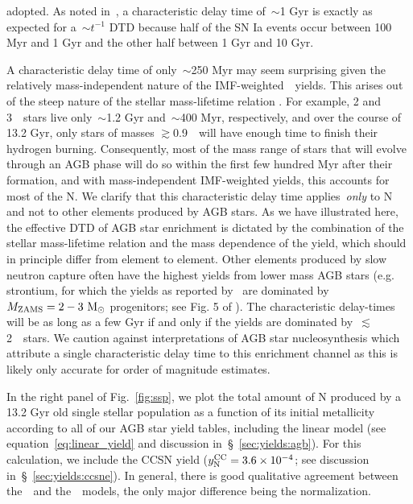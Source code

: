 \documentclass[ms.tex]{subfiles}
\begin{document}
adopted.
As noted in~\citet{Johnson2021}, a characteristic delay time of~$\sim$1 Gyr
is exactly as expected for a~$\sim t^{-1}$ DTD because half of the SN Ia
events occur between 100 Myr and 1 Gyr and the other half between 1 Gyr and
10 Gyr.
\par
A characteristic delay time of only~$\sim$250 Myr may seem surprising given
the relatively mass-independent nature of the IMF-weighted~\cristallo~yields.
This arises out of the steep nature of the stellar mass-lifetime relation
\citep[e.g.][]{Larson1974, Maeder1998, Padovani1993}.
For example, 2 and 3~\msun~stars live only~$\sim$1.2 Gyr and~$\sim$400 Myr,
respectively, and over the course of 13.2 Gyr, only stars of masses
$\gtrsim$0.9~\msun~will have enough time to finish their hydrogen burning.
Consequently, most of the mass range of stars that will evolve through an
AGB phase will do so within the first few hundred Myr after their formation,
and with mass-independent IMF-weighted yields, this accounts for most of the
N.
We clarify that this characteristic delay time applies~\textit{only} to N and
not to other elements produced by AGB stars.
As we have illustrated here, the effective DTD of AGB star enrichment is
dictated by the combination of the stellar mass-lifetime relation and the
mass dependence of the yield, which should in principle differ from element to
element.
Other elements produced by slow neutron capture often have the highest yields
from lower mass AGB stars (e.g. strontium, for which the yields as
reported by~\citealp{Cristallo2011, Cristallo2015} are dominated by
$M_\text{ZAMS} = 2 - 3~\text{M}_\odot$ progenitors; see Fig. 5 of
\citealp{Johnson2020}).
The characteristic delay-times will be as long as a few Gyr if and only if the
yields are dominated by~$\lesssim$2~\msun~stars.
We caution against interpretations of AGB star nucleosynthesis which attribute
a single characteristic delay time to this enrichment channel as this is
likely only accurate for order of magnitude estimates.
\par
In the right panel of Fig.~\ref{fig:ssp}, we plot the total amount of N
produced by a 13.2 Gyr old single stellar population as a function of its
initial metallicity according to all of our AGB star yield tables, including
the linear model (see equation~\ref{eq:linear_yield} and discussion
in~\S~\ref{sec:yields:agb}).
For this calculation, we include the CCSN yield ($y_\text{N}^\text{CC} = 3.6\times10^{-4}$;
see discussion in~\S~\ref{sec:yields:ccsne}).
In general, there is good qualitative agreement between the~\cristallo~and
the~\ventura~models, the only major difference being the normalization.
\end{document}
